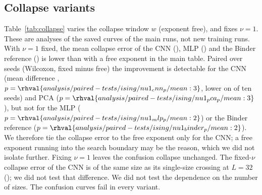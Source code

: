 \subsection{Collapse variants}
Table~\ref{tab:collapse} varies the collapse window $w$ (exponent free), and fixes $\nu=1$. These are analyses of the saved curves of the main runs, not new training runs. With $\nu=1$ fixed, the mean collapse error of the CNN (), MLP () and the Binder reference () is lower than with a free exponent in the main table. Paired over seeds (Wilcoxon, fixed minus free) the improvement is detectable for the CNN (mean difference , $p=\rhval{analysis/paired-tests/ising/nu1_cnn_p/mean:3}$, lower on  of ten seeds) and PCA ($p=\rhval{analysis/paired-tests/ising/nu1_pca_p/mean:3}$), but not for the MLP ($p=\rhval{analysis/paired-tests/ising/nu1_mlp_p/mean:2}$) or the Binder reference ($p=\rhval{analysis/paired-tests/ising/nu1_binder_p/mean:2}$). We therefore tie the collapse error to the free exponent only for the CNN; a free exponent running into the search boundary may be the reason, which we did not isolate further. Fixing $\nu=1$ leaves the confusion collapse unchanged. The fixed-$\nu$ collapse error of the CNN is of the same size as its single-size crossing at $L=32$ (); we did not test that difference. We did not test the dependence on the number of sizes. The confusion curves fail in every variant.

\begin{table}[t]\centering\caption{Collapse error $|\hat T_c^{\rm fss}-T_c|$ (mean over seeds) for three windows $w$ with $\nu$ free, with $\nu=1$ fixed ($w=0.6$), and the main-table exponent error.}\label{tab:collapse}
\resizebox{\columnwidth}{!}{}
\end{table}

